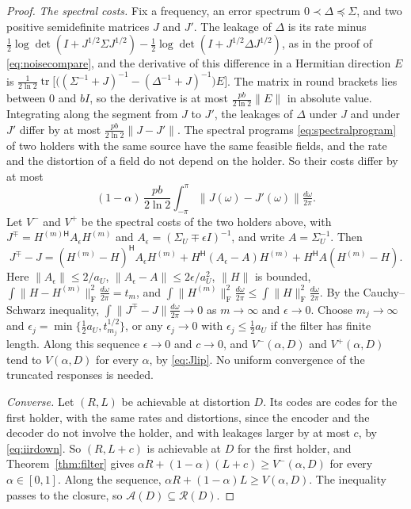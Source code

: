 \documentclass[11pt,onecolumn]{IEEEtran}
\newcommand{\tr}{\operatorname{tr}}
\newcommand{\dw}{\tfrac{d\omega}{2\pi}}
\newcommand{\herm}{\mathsf H}
\begin{document}
\begin{proof}
\emph{The spectral costs.} Fix a frequency, an error spectrum
$0\prec\Delta\preceq\Sigma$, and two positive semidefinite matrices $J$
and $J'$. The leakage of $\Delta$ is its rate minus
$\tfrac12\log\det(I+J^{1/2}\Sigma J^{1/2})-\tfrac12\log\det(I+J^{1/2}\Delta J^{1/2})$,
as in the proof of \eqref{eq:noisecompare}, and the derivative of this
difference in a Hermitian direction $E$ is
$\tfrac1{2\ln2}\tr\bigl[\bigl((\Sigma^{-1}+J)^{-1}-(\Delta^{-1}+J)^{-1}\bigr)E\bigr]$.
The matrix in round brackets lies between $0$ and $bI$, so the
derivative is at most $\tfrac{pb}{2\ln2}\|E\|$ in absolute value.
Integrating along the segment from $J$ to $J'$, the leakages of $\Delta$
under $J$ and under $J'$ differ by at most $\tfrac{pb}{2\ln2}\|J-J'\|$.
The spectral programs \eqref{eq:spectralprogram} of two holders with the
same source have the same feasible fields, and the rate and the
distortion of a field do not depend on the holder. So their costs
differ by at most
\begin{equation}
(1-\alpha)\,\frac{pb}{2\ln2}\int_{-\pi}^{\pi}\bigl\|J(\omega)-J'(\omega)\bigr\|\dw .
\label{eq:Jlip}
\end{equation}
Let $V^-$ and $V^+$ be the spectral costs of the two holders above, with
$J^{\mp}=H^{(m)\herm}A_\epsilon H^{(m)}$ and
$A_\epsilon=(\Sigma_U\mp\epsilon I)^{-1}$, and write
$A=\Sigma_U^{-1}$. Then
\[
J^{\mp}-J=(H^{(m)}-H)^{\herm}A_\epsilon H^{(m)}+H^{\herm}(A_\epsilon-A)H^{(m)}+H^{\herm}A(H^{(m)}-H) .
\]
Here $\|A_\epsilon\|\le2/a_U$, $\|A_\epsilon-A\|\le2\epsilon/a_U^2$,
$\|H\|$ is bounded, $\int\|H-H^{(m)}\|_{\mathrm F}^2\dw=t_m$, and
$\int\|H^{(m)}\|_{\mathrm F}^2\dw\le\int\|H\|_{\mathrm F}^2\dw$. By the
Cauchy--Schwarz inequality, $\int\|J^{\mp}-J\|\dw\to0$ as $m\to\infty$
and $\epsilon\to0$. Choose $m_j\to\infty$ and
$\epsilon_j=\min\{\tfrac12a_U,t_{m_j}^{1/2}\}$, or any $\epsilon_j\to0$
with $\epsilon_j\le\tfrac12a_U$ if the filter has finite length. Along
this sequence $\epsilon\to0$ and $c\to0$, and
$V^-(\alpha,D)$ and $V^+(\alpha,D)$ tend to $V(\alpha,D)$ for every
$\alpha$, by \eqref{eq:Jlip}. No uniform convergence of the truncated
responses is needed.

\emph{Converse.} Let $(R,L)$ be achievable at distortion $D$. Its codes
are codes for the first holder, with the same rates and distortions,
since the encoder and the decoder do not involve the holder, and with
leakages larger by at most $c$, by \eqref{eq:iirdown}. So $(R,L+c)$ is
achievable at $D$ for the first holder, and Theorem~\ref{thm:filter}
gives $\alpha R+(1-\alpha)(L+c)\ge V^-(\alpha,D)$ for every
$\alpha\in[0,1]$. Along the sequence,
$\alpha R+(1-\alpha)L\ge V(\alpha,D)$. The inequality passes to the
closure, so $\mathcal A(D)\subseteq\mathcal R(D)$.


\end{proof}
\end{document}
